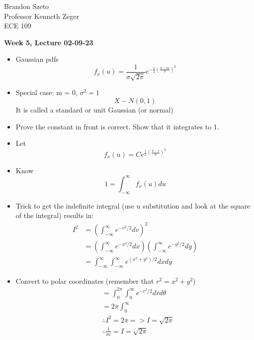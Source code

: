\documentclass[10pt]{article}
\begin{document}
\begin{flushleft}
    Brandon Szeto \\
    Professor Kenneth Zeger \\
	ECE 109 \\
\end{flushleft}

\begin{center}
	\Large \textbf{Week 5, Lecture 02-09-23}
\end{center}
\normalsize

\begin{flushleft}

\begin{itemize}
    \item Gaussian pdfs
        $$ f_x(u) = \frac{1}{\sigma \sqrt{2\pi}} e^{-\frac{1}{2}(\frac{\sigma -
        m}{\sigma})^2} $$
    \item Special case: m = 0, $\sigma^2 = 1$ 
        $$ X - N(0,1) $$
        It is called a standard or unit Gaussian (or normal)
    \item Prove the constant in front is correct. Show that it integrates to 1.
    \item Let $$ f_x(u) = Ce^{\frac{1}{2}(\frac{u - c}{\sigma})^2} $$
    \item Know $$ 1 = \int_{-\infty}^{\infty} f_x(u)du $$
    \item Trick to get the indefinite integral (use u substitution and look at
        the square of the integral) results in:
        $$ \begin{aligned}
            I^2 &= (\int_{-\infty}^{\infty}e^{-v^2/2} dv)^2 \\
                &= (\int_{-\infty}^{\infty}e^{-x^2/2} dx)
                (\int_{-\infty}^{\infty}e^{-y^2/2} dy) \\
                &= \int_{-\infty}^{\infty} \int_{-\infty}^{\infty} e^{(x^2 +
                y^2)/2} dxdy
        \end{aligned}$$
    \item Convert to polar coordinates (remember that $r^2 = x^2 + y^2$)
        $$ \begin{aligned}
            &= \int_{0}^{2\pi} \int_{0}^{\infty}e^{-r^2/2}drd\theta \\
            &= 2\pi \int_{0}^{\infty} \\
            &\therefore I^2 = 2\pi => I = \sqrt{2\pi} \\
            &\therefore \frac{1}{\sigma c} = I = \sqrt{2\pi} \\

\end{aligned}$$
\end{itemize}
\end{flushleft}
\end{document}
